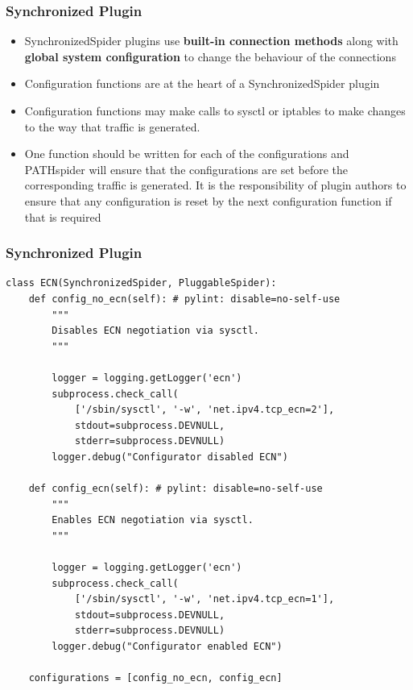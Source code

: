 \documentclass[handout,notes]{beamer}
\begin{document}

\begin{frame}
\frametitle{Synchronized Plugin}
\begin{itemize}
\item{SynchronizedSpider plugins use \textbf{built-in connection methods} along with
\textbf{global system configuration} to change the behaviour of the
connections}
\item{Configuration functions are at the heart of a SynchronizedSpider plugin}
\item{Configuration functions may make calls to sysctl or iptables to make
changes to the way that traffic is generated.}
\item{One function should be written for each of the configurations and PATHspider
will ensure that the configurations are set before the corresponding traffic is
generated. It is the responsibility of plugin authors to ensure that any
configuration is reset by the next configuration function if that is required}
\end{itemize}
\end{frame}

\begin{frame}[fragile]
\frametitle{Synchronized Plugin}
\begin{lstlisting}[caption={Configuration Functions for the ECN Plugin}]
class ECN(SynchronizedSpider, PluggableSpider):
    def config_no_ecn(self): # pylint: disable=no-self-use
        """
        Disables ECN negotiation via sysctl.
        """

        logger = logging.getLogger('ecn')
        subprocess.check_call(
            ['/sbin/sysctl', '-w', 'net.ipv4.tcp_ecn=2'],
            stdout=subprocess.DEVNULL,
            stderr=subprocess.DEVNULL)
        logger.debug("Configurator disabled ECN")

    def config_ecn(self): # pylint: disable=no-self-use
        """
        Enables ECN negotiation via sysctl.
        """

        logger = logging.getLogger('ecn')
        subprocess.check_call(
            ['/sbin/sysctl', '-w', 'net.ipv4.tcp_ecn=1'],
            stdout=subprocess.DEVNULL,
            stderr=subprocess.DEVNULL)
        logger.debug("Configurator enabled ECN")

    configurations = [config_no_ecn, config_ecn]
\end{lstlisting}
\end{frame}
\end{document}
